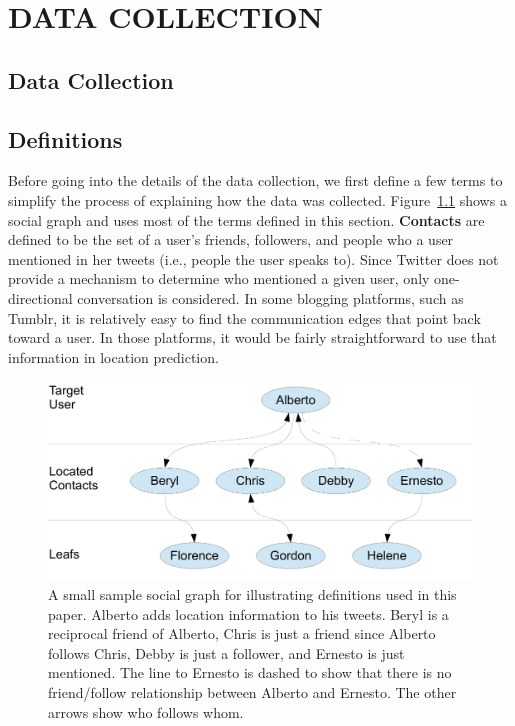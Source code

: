 \ifdefined\THESIS
    \chapter{\uppercase {Data Collection}}

\else
    \section{Data Collection}
\fi

\section{Definitions}

Before going into the details of the data collection, we first define a few
terms to simplify the process of explaining how the data was collected.
%
Figure~\ref{fig:Terms} shows a social graph and uses most of the terms defined
in this section.
%
\textbf{Contacts} are defined to be the set of a user's friends, followers, and
people who a user mentioned in her tweets (i.e., people the user speaks to).
%
Since Twitter does not provide a mechanism to determine who mentioned a given
user, only one-directional conversation is considered.
%
In some blogging platforms, such as Tumblr, it is relatively easy to find the
communication edges that point back toward a user.
%
In those platforms, it would be fairly straightforward to use that information
in location prediction.

\begin{figure}[tbh]
\centering
\includegraphics[width=\linewidth]{figures/terms.pdf}
\caption{
A small sample social graph for illustrating definitions used in this paper.
Alberto adds location information to his tweets.
Beryl is a reciprocal friend of Alberto, Chris is just a friend since Alberto
follows Chris, Debby is just a follower, and Ernesto is just mentioned.
The line to Ernesto is dashed to show that there is no friend/follow
relationship between Alberto and Ernesto.
The other arrows show who follows whom.
}
\label{fig:Terms}
\end{figure}


